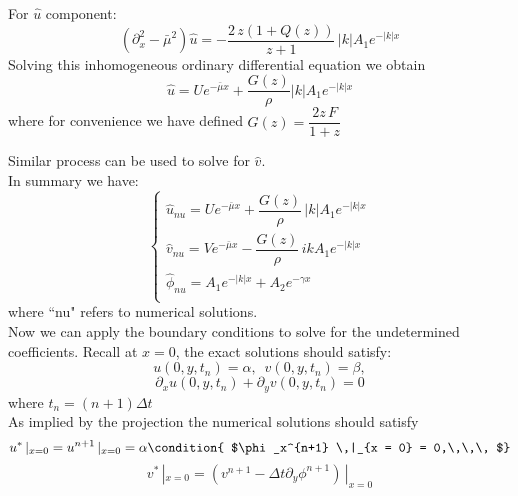 For $\hat{u}$ component:
\begin{equation*}
(\partial_x^2 - \bar{\mu}^2) \hat{u} = - \dfrac{2 \, z (1+ Q(z))}{z + 1} \, |k| A_1 e^{- |k| x}
\end{equation*}
Solving this inhomogeneous ordinary differential equation we obtain
\begin{dmath*}\label{eq:solution of numerical u}
\hat{u} = U e^{-\bar{\mu} x} + \dfrac{G(z)}{\rho} |k| A_1 e^{- |k| x}
\end{dmath*}
where for convenience we have defined $G(z) = \dfrac{2z\,F}{1+z}$

Similar process can be used to solve for $\hat{v}$.\\

In summary we have:
\begin{equation}\label{eq:solutions of numerical u, v and phi}
\begin{cases}
\hat{u}_{nu} = U e^{-\bar{\mu} x} + \dfrac{G(z)}{\rho} \, |k| A_1 e^{- |k| x} \\
\hat{v}_{nu} = V e^{-\bar{\mu} x} - \dfrac{G(z)}{\rho} \, i k A_1 e^{- |k| x} \\
\hat{\phi}_{nu} = A_1 e^{- |k| x} + A_2 e^{- \gamma x} \\
\end{cases}
\end{equation}
where ``nu" refers to numerical solutions.\\

Now we can apply the boundary conditions to solve for the undetermined coefficients. Recall at $x = 0$, the exact solutions should satisfy: 
\begin{equation}\label{eq:equations for boundary conditions for u* in normal mode analysis}
u(0,y,t_n) =\alpha, \, \, \, v(0,y,t_n) = \beta,
\end{equation}
\begin{equation*}
\partial_x u(0,y,t_n) + \partial_y v(0,y,t_n) = 0
\end{equation*}
where $t_n = (n+1)\Delta t$\\
As implied by the projection the numerical solutions should satisfy
\begin{dmath}\label{eq:boundary conditions for intermediate velocity field in normal mode analysis}
u^* \,|_{x=0} = u^{n+1}\,|_{x = 0} = \alpha \condition{   $\phi_x^{n+1} \,|_{x = 0} = 0,\,\,\, $}
\end{dmath}
\begin{dmath*}
v^* \,|_{x = 0} = (v^{n+1} - \Delta t \partial_y\phi^{n+1}) \,|_{x = 0}
\end{dmath*}

